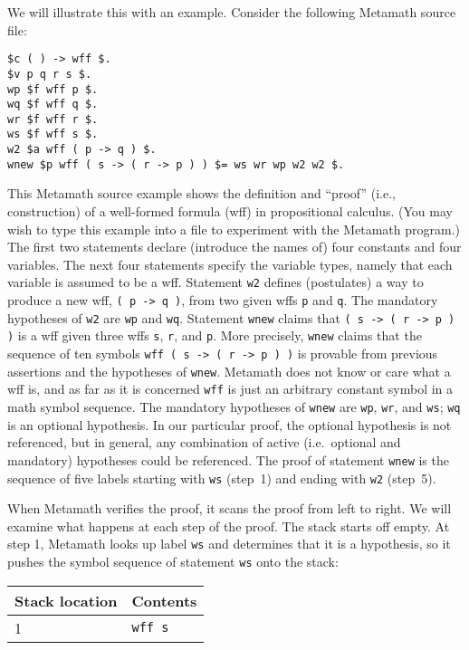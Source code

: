 We will illustrate this with an example.
Consider the following Metamath source file:
\begin{verbatim}
$c ( ) -> wff $.
$v p q r s $.
wp $f wff p $.
wq $f wff q $.
wr $f wff r $.
ws $f wff s $.
w2 $a wff ( p -> q ) $.
wnew $p wff ( s -> ( r -> p ) ) $= ws wr wp w2 w2 $.
\end{verbatim}
This Metamath source example shows the definition and ``proof'' (i.e.,
construction) of a well-formed formula (wff)
in propositional calculus.  (You may wish to type this example into a file to
experiment with the Metamath program.)  The first two statements declare
(introduce the names of) four constants and four variables.  The next four
statements specify the variable types, namely that
each variable is assumed to be a wff.  Statement \texttt{w2} defines (postulates)
a way to produce a new wff, \texttt{( p -> q )}, from two given wffs \texttt{p} and
\texttt{q}. The mandatory hypotheses of \texttt{w2} are \texttt{wp} and \texttt{wq}.
Statement \texttt{wnew} claims that \texttt{( s -> ( r -> p ) )} is a wff given
three wffs \texttt{s}, \texttt{r}, and \texttt{p}.  More precisely, \texttt{wnew} claims
that the sequence of ten symbols \texttt{wff ( s -> ( r -> p ) )} is provable from
previous assertions and the hypotheses of \texttt{wnew}.  Metamath does not know
or care what a wff is, and as far as it is concerned \texttt{wff} is just an
arbitrary constant symbol in a math symbol sequence.  The mandatory hypotheses
of \texttt{wnew} are \texttt{wp}, \texttt{wr}, and \texttt{ws}; \texttt{wq} is an optional
hypothesis.  In our particular proof, the optional hypothesis is not
referenced, but in general, any combination of active (i.e.\ optional and
mandatory) hypotheses could be referenced.  The proof of statement \texttt{wnew}
is the sequence of five labels starting with \texttt{ws} (step~1) and ending with
\texttt{w2} (step~5).

When Metamath verifies the proof, it scans the proof from left to right.  We
will examine what happens at each step of the proof.  The stack starts off
empty.  At step 1, Metamath looks up label \texttt{ws} and determines that it is a
hypothesis, so it pushes the symbol sequence of statement \texttt{ws} onto the
stack:

\begin{center}\begin{tabular}{|l|l|}\hline
{Stack location} & {Contents} \\ \hline \hline
1 & \texttt{wff s} \\ \hline
\end{tabular}\end{center}

